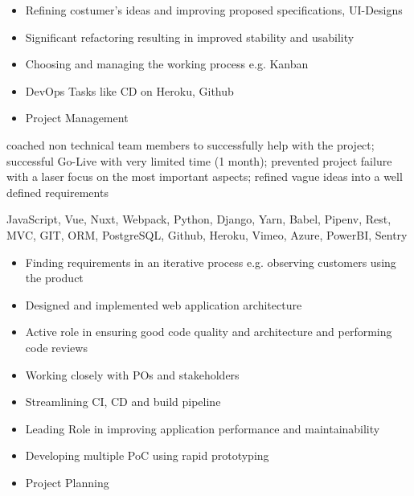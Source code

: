 \documentclass[9pt,a4paper]{altacv}
\begin{document}
\begin{itemize}
\item Refining costumer's ideas and improving proposed specifications, UI-Designs
\item Significant refactoring resulting in improved stability and usability
\item Choosing and managing the working process e.g. Kanban
\item DevOps Tasks like CD on Heroku, Github
\item Project Management

\end{itemize}

coached non technical team members to successfully help with the project;
successful Go-Live with very limited time (1 month);
prevented project failure with a laser focus on the most important aspects;
refined vague ideas into a well defined requirements

JavaScript, Vue, Nuxt, Webpack, Python, Django, Yarn, Babel, Pipenv,
Rest, MVC, GIT, ORM, PostgreSQL, Github, Heroku, Vimeo, Azure, PowerBI, Sentry

\divider

%

\begin{itemize}
\item Finding requirements in an iterative process e.g. observing customers using the product
\item Designed and implemented web application architecture
\item Active role in ensuring good code quality and architecture and performing code reviews
\item Working closely with POs and stakeholders
\item Streamlining CI, CD and build pipeline
\item Leading Role in improving application performance and maintainability
\item Developing multiple PoC using rapid prototyping
\item Project Planning

\end{itemize}
\end{document}
